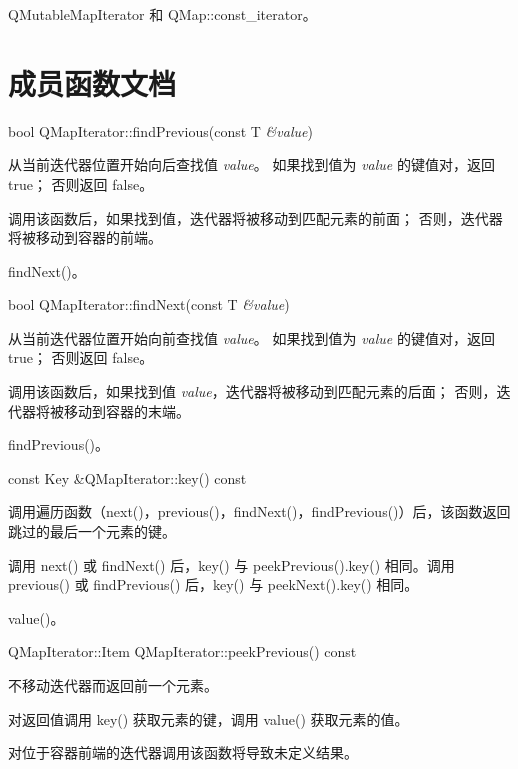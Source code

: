 \begin{seeAlso}
QMutableMapIterator 和 QMap::const\_iterator。
\end{seeAlso}

\section{成员函数文档}

bool QMapIterator::findPrevious(const T \emph{\&value})

从当前迭代器位置开始向后查找值 \emph{value}。
如果找到值为 \emph{value} 的键值对，返回 true；
否则返回 false。

调用该函数后，如果找到值，迭代器将被移动到匹配元素的前面；
否则，迭代器将被移动到容器的前端。

\begin{seeAlso}
findNext()。
\end{seeAlso}

\splitLine

bool QMapIterator::findNext(const T \emph{\&value})

从当前迭代器位置开始向前查找值 \emph{value}。
如果找到值为 \emph{value} 的键值对，返回 true；
否则返回 false。

调用该函数后，如果找到值 \emph{value}，迭代器将被移动到匹配元素的后面；
否则，迭代器将被移动到容器的末端。

\begin{seeAlso}
findPrevious()。
\end{seeAlso}
    
\splitLine

const Key \&QMapIterator::key() const

调用遍历函数（next()，previous()，findNext()，findPrevious()）后，该函数返回跳过的最后一个元素的键。

调用 next() 或 findNext() 后，key() 与 peekPrevious().key() 相同。调用 previous() 或 findPrevious() 后，key() 与 peekNext().key() 相同。

\begin{seeAlso}
value()。
\end{seeAlso}

\splitLine

QMapIterator::Item QMapIterator::peekPrevious() const

不移动迭代器而返回前一个元素。

对返回值调用 key() 获取元素的键，调用 value() 获取元素的值。

对位于容器前端的迭代器调用该函数将导致未定义结果。

